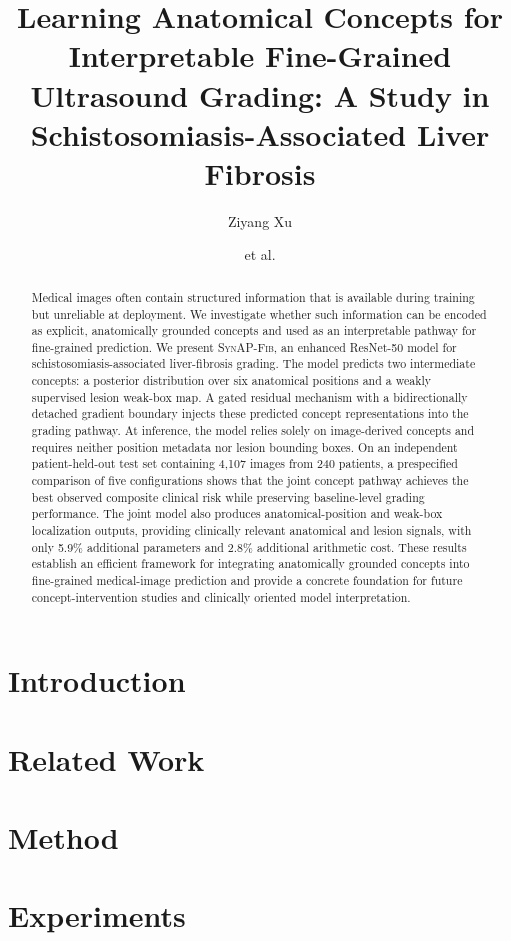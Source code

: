 \documentclass{article}
\title{Learning Anatomical Concepts for Interpretable Fine-Grained Ultrasound Grading: A Study in Schistosomiasis-Associated Liver Fibrosis}
\author{Ziyang Xu \and et al.}
\newcommand{\method}{\textsc{SynAP-Fib}}
\begin{document}
\maketitle
\begin{abstract}
Medical images often contain structured information that is available during training but unreliable at deployment. We investigate whether such information can be encoded as explicit, anatomically grounded concepts and used as an interpretable pathway for fine-grained prediction. We present \method, an enhanced ResNet-50 model for schistosomiasis-associated liver-fibrosis grading. The model predicts two intermediate concepts: a posterior distribution over six anatomical positions and a weakly supervised lesion weak-box map. A gated residual mechanism with a bidirectionally detached gradient boundary injects these predicted concept representations into the grading pathway. At inference, the model relies solely on image-derived concepts and requires neither position metadata nor lesion bounding boxes. On an independent patient-held-out test set containing 4,107 images from 240 patients, a prespecified comparison of five configurations shows that the joint concept pathway achieves the best observed composite clinical risk while preserving baseline-level grading performance. The joint model also produces anatomical-position and weak-box localization outputs, providing clinically relevant anatomical and lesion signals, with only 5.9\% additional parameters and 2.8\% additional arithmetic cost. These results establish an efficient framework for integrating anatomically grounded concepts into fine-grained medical-image prediction and provide a concrete foundation for future concept-intervention studies and clinically oriented model interpretation.\end{abstract}

\section{Introduction}
\label{sec:intro}

\section{Related Work}

\section{Method}
\label{sec:methods}

\section{Experiments}
\label{sec:results}

\end{document}

